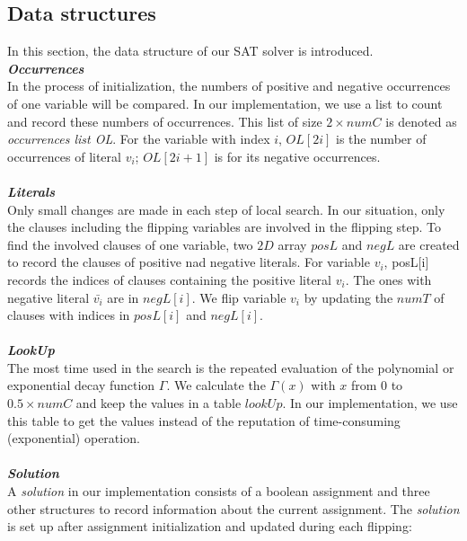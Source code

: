 \documentclass[12pt,a4paper,twoside]{scrartcl}
\numberwithin{equation}{section}
\begin{document}
\subsection{Data structures}
\label{subsec:Data structures}
In this section, the data structure of our SAT solver is introduced. \\
\emph{\textbf{Occurrences}}
\\
In the process of initialization, the numbers of positive and negative occurrences of one variable will be compared. In our implementation, we use a list to count and record these numbers of occurrences. This list of size $2 \times numC $ is denoted as \emph{occurrences list OL}. For the variable with index $i$, $OL[2i]$ is the number of occurrences of literal $v_i$; $OL[2i+1]$ is for its negative occurrences. \\
\\
\emph{\textbf{ Literals}}
\\
Only small changes are made in each step of local search. In our situation, only the clauses including the flipping variables are involved in the flipping step. To find the involved clauses of one variable,  two $2D$ array $posL$ and $negL$ are created to record the clauses of positive nad negative literals. For variable $v_i $, posL[i] records the indices of clauses containing the positive literal $v_i$. The ones with negative literal $\bar{v_i}$ are in $negL[i]$. We flip variable $v_i$ by updating the $numT$ of clauses with indices in $posL[i]$ and $negL[i]$.\\
\\
\emph{\textbf{LookUp}}
\\
The most time used in the search is the repeated  evaluation of the polynomial or exponential decay function $\Gamma$. We calculate the $\Gamma(x)$ with $x$ from $0$ to $0.5 \times numC$ and keep the values in a table $lookUp$. In our implementation, we use this table to get the values instead of the reputation of time-consuming (exponential) operation.  \\
\\
\emph{\textbf{Solution}}
\\
A \emph{solution} in our implementation consists of a boolean assignment and three other structures to record information about the current assignment. The \emph{solution} is set up after assignment initialization and updated during each flipping:\\
\end{document}
